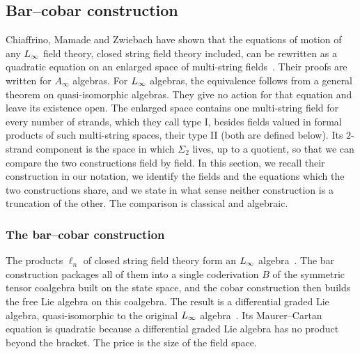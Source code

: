 \subsection{Bar–cobar construction}
\label{p:sec:bar-cobar}


Chiaffrino, Mamade and Zwiebach have shown that the equations of motion of any $L_\infty$ field theory, closed string field theory included, can be rewritten as a quadratic equation on an enlarged space of multi-string fields~\cite{Chiaffrino:2026:UniversalQuadraticField}.
Their proofs are written for $A_\infty$ algebras. For $L_\infty$ algebras, the equivalence follows from a general theorem on quasi-isomorphic algebras.
They give no action for that equation and leave its existence open.
The enlarged space contains one multi-string field for every number of strands, which they call type I, besides fields valued in formal products of such multi-string spaces, their type II (both are defined below).
Its $2$-strand component is the space in which $\Sigma_2$ lives, up to a quotient, so that we can compare the two constructions field by field.
In this section, we recall their construction in our notation, we identify the fields and the equations which the two constructions share, and we state in what sense neither construction is a truncation of the other.
The comparison is classical and algebraic.


\subsubsection{The bar–cobar construction}
\label{p:sec:barcobar:construction}

The products $\ell_n$ of closed string field theory form an $L_\infty$ algebra~\cite{Zwiebach:1993:ClosedStringField,Erbin:2021:StringFieldTheory}.
The bar construction packages all of them into a single coderivation $B$ of the symmetric tensor coalgebra built on the state space, and the cobar construction then builds the free Lie algebra on this coalgebra.
The result is a differential graded Lie algebra, quasi-isomorphic to the original $L_\infty$ algebra~\cite{Chiaffrino:2026:UniversalQuadraticField}.
Its Maurer--Cartan equation is quadratic because a differential graded Lie algebra has no product beyond the bracket. The price is the size of the field space.

